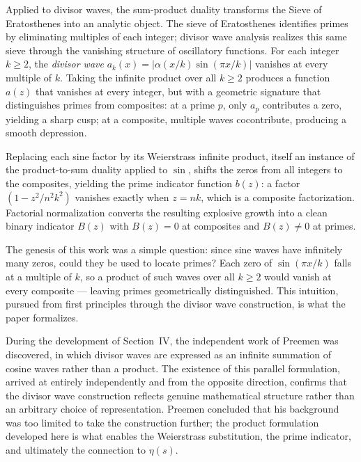 \documentclass{article}
\begin{document}
Applied to divisor waves, the sum-product duality transforms the Sieve of Eratosthenes into an analytic object. The sieve of Eratosthenes identifies primes by eliminating multiples of each integer; divisor wave analysis realizes this same sieve through the vanishing structure of oscillatory functions. For each integer $k \geq 2$, the \emph{divisor wave} $a_k(x) = |\alpha(x/k)\sin(\pi x/k)|$ vanishes at every multiple of $k$. Taking the infinite product over all $k \geq 2$ produces a function $a(z)$ that vanishes at every integer, but with a geometric signature that distinguishes primes from composites: at a prime $p$, only $a_p$ contributes a zero, yielding a sharp cusp; at a composite, multiple waves cocontribute, producing a smooth depression.

Replacing each sine factor by its Weierstrass infinite product, itself an instance of the product-to-sum duality applied to $\sin$, shifts the zeros from all integers to the composites, yielding the prime indicator function $b(z)$: a factor $(1 - z^2/n^2k^2)$ vanishes exactly when $z = nk$, which is a composite factorization. Factorial normalization converts the resulting explosive growth into a clean binary indicator $B(z)$ with $B(z) = 0$ at composites and $B(z) \neq 0$ at primes.

The genesis of this work was a simple question: since sine waves have infinitely many zeros, could they be used to locate primes? Each zero of $\sin(\pi x/k)$ falls at a multiple of $k$, so a product of such waves over all $k \geq 2$ would vanish at every composite — leaving primes geometrically distinguished. This intuition, pursued from first principles through the divisor wave construction, is what the paper formalizes.

During the development of Section~IV, the independent work of Preemen \cite{preemen2020wave} was discovered, in which divisor waves are expressed as an infinite summation of cosine waves rather than a product. The existence of this parallel formulation, arrived at entirely independently and from the opposite direction, confirms that the divisor wave construction reflects genuine mathematical structure rather than an arbitrary choice of representation. Preemen concluded that his background was too limited to take the construction further; the product formulation developed here is what enables the Weierstrass substitution, the prime indicator, and ultimately the connection to $\eta(s)$.
\end{document}
